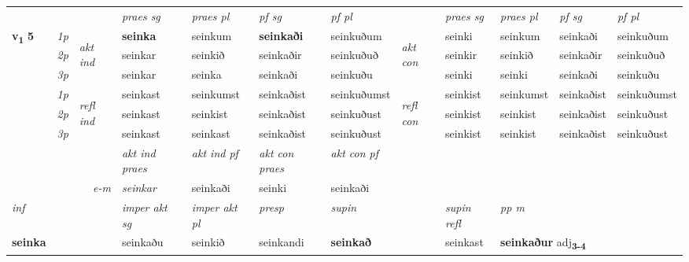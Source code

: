 \begin{longtable}[l]{X>{\footnotesize\itshape}llXXXXlXXXX}
\midrule

 & &   & \textit{praes sg}  & \textit{praes pl}    & \textit{ pf sg} & \textit{pf pl} & & \textit{praes sg}  & \textit{praes pl}    & \textit{pf sg} & \textit{pf pl }  \\ \cmidrule{4-7} \cmidrule{9-12}
 \multirow{2}{*}{{{\textbf{v{\textsubscript{1}}} \Large{\textbf{5}}}}}  & 1p & \multirow{3}{*}{\begin{turn}{90}\textit{akt ind}\end{turn}} & \textbf{seinka} & seinkum & \textbf{seinkaði} & seinkuðum & \multirow{3}{*}{\begin{turn}{90}\textit{akt con}\end{turn}} &seinki & seinkum & seinkaði & seinkuðum\\*
 & 2p &  &  seinkar  & seinkið & seinkaðir & seinkuðuð & & seinkir & seinkið & seinkaðir & seinkuðuð \\*
 & 3p &  & seinkar & seinka & seinkaði & seinkuðu & & seinki & seinki& seinkaði & seinkuðu \\*
\cmidrule{4-7} \cmidrule{9-12}
 & 1p & \multirow{3}{*}{\begin{turn}{90}\textit{refl ind}\end{turn}}  & seinkast & seinkumst & seinkaðist & seinkuðumst & \multirow{3}{*}{\begin{turn}{90}\textit{refl con}\end{turn}}  &seinkist & seinkumst & seinkaðist & seinkuðumst \\*
 & 2p &  & seinkast & seinkist & seinkaðist & seinkuðust & &seinkist & seinkist & seinkaðist & seinkuðust \\*
 & 3p  & & seinkast & seinkast & seinkaðist & seinkuðust & & seinkist & seinkist& seinkaðist & seinkuðust \\*
\cmidrule{4-7} \cmidrule{9-12}

   && &  \textit{akt ind praes} & \textit{akt ind pf} & \textit{akt con praes} & \textit{akt con pf} \\*
\multicolumn{3}{r}{\textit{e-m}} & seinkar & seinkaði & seinki & seinkaði \\*

\cmidrule{4-7}
   {\textit{inf}} & &  & \textit{imper akt sg} & \textit{imper akt pl}   & \textit{presp} & \textit{supin} && \textit{supin refl} & \textit{pp m} \\*
  {\textbf{seinka}} & && seinkaðu  & seinkið   & seinkandi &  \textbf{seinkað} && seinkast & \multicolumn{2}{l}{\textbf{seinkaður} adj\textbf{\textsubscript{3-4}}} \\*


\end{longtable}
